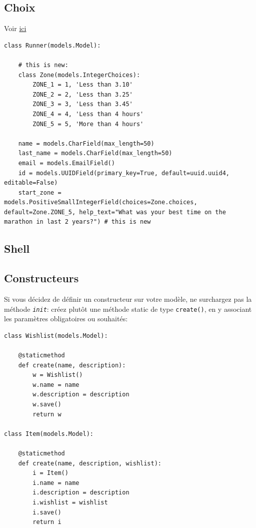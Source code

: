\documentclass[11pt]{amsbook}
\begin{document}
\hypertarget{x-choix}{\subsection{Choix}}
Voir \href{https://girlthatlovestocode.com/django-model}{ici}


\begin{verbatim}
class Runner(models.Model):

    # this is new:
    class Zone(models.IntegerChoices):
        ZONE_1 = 1, 'Less than 3.10'
        ZONE_2 = 2, 'Less than 3.25'
        ZONE_3 = 3, 'Less than 3.45'
        ZONE_4 = 4, 'Less than 4 hours'
        ZONE_5 = 5, 'More than 4 hours'

    name = models.CharField(max_length=50)
    last_name = models.CharField(max_length=50)
    email = models.EmailField()
    id = models.UUIDField(primary_key=True, default=uuid.uuid4, editable=False)
    start_zone = models.PositiveSmallIntegerField(choices=Zone.choices, default=Zone.ZONE_5, help_text="What was your best time on the marathon in last 2 years?") # this is new
\end{verbatim}

\hypertarget{x-shell}{\subsection{Shell}}

\hypertarget{x-constructeurs}{\subsection{Constructeurs}}
Si vous décidez de définir un constructeur sur votre modèle, ne surchargez pas la méthode \texttt{\emph{init}}: créez plutôt une méthode static de type \texttt{create()}, en y associant les paramètres obligatoires ou souhaités:


\begin{verbatim}
class Wishlist(models.Model):

    @staticmethod
    def create(name, description):
        w = Wishlist()
        w.name = name
        w.description = description
        w.save()
        return w

class Item(models.Model):

    @staticmethod
    def create(name, description, wishlist):
        i = Item()
        i.name = name
        i.description = description
        i.wishlist = wishlist
        i.save()
        return i
\end{verbatim}
\end{document}
